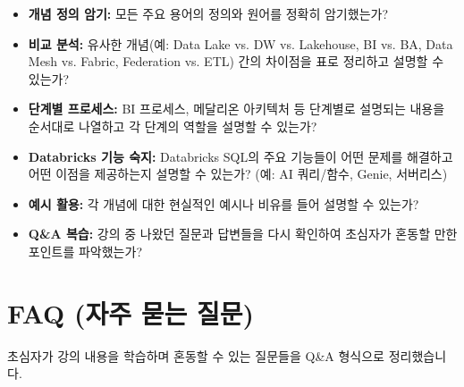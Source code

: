 \documentclass[11pt,a4paper]{article}
\begin{document}
\begin{tcolorbox}[mybox={시험 대비 전략 체크리스트}]
\begin{itemize}
    \item \textbf{개념 정의 암기:} 모든 주요 용어의 정의와 원어를 정확히 암기했는가?
    \item \textbf{비교 분석:} 유사한 개념(예: Data Lake vs. DW vs. Lakehouse, BI vs. BA, Data Mesh vs. Fabric, Federation vs. ETL) 간의 차이점을 표로 정리하고 설명할 수 있는가?
    \item \textbf{단계별 프로세스:} BI 프로세스, 메달리온 아키텍처 등 단계별로 설명되는 내용을 순서대로 나열하고 각 단계의 역할을 설명할 수 있는가?
    \item \textbf{Databricks 기능 숙지:} Databricks SQL의 주요 기능들이 어떤 문제를 해결하고 어떤 이점을 제공하는지 설명할 수 있는가? (예: AI 쿼리/함수, Genie, 서버리스)
    \item \textbf{예시 활용:} 각 개념에 대한 현실적인 예시나 비유를 들어 설명할 수 있는가?
    \item \textbf{Q\&A 복습:} 강의 중 나왔던 질문과 답변들을 다시 확인하여 초심자가 혼동할 만한 포인트를 파악했는가?
\end{itemize}
\end{tcolorbox}

\newpage
\section{FAQ (자주 묻는 질문)}

초심자가 강의 내용을 학습하며 혼동할 수 있는 질문들을 Q\&A 형식으로 정리했습니다.
\end{document}
